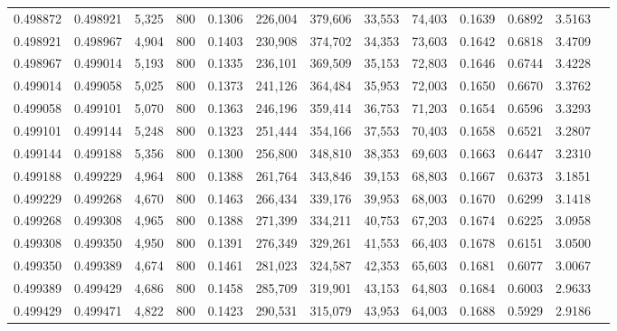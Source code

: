 \begin{tabular}{rrrrrrrrrrrrr}
0.498872 & 0.498921 & 5,325 & 800 &                                     0.1306 & 226,004 & 379,606 &  33,553 &  74,403 & 0.1639 & 0.6892 & 3.5163 \\
0.498921 & 0.498967 & 4,904 & 800 &                                     0.1403 & 230,908 & 374,702 &  34,353 &  73,603 & 0.1642 & 0.6818 & 3.4709 \\
0.498967 & 0.499014 & 5,193 & 800 &                                     0.1335 & 236,101 & 369,509 &  35,153 &  72,803 & 0.1646 & 0.6744 & 3.4228 \\
0.499014 & 0.499058 & 5,025 & 800 &                                     0.1373 & 241,126 & 364,484 &  35,953 &  72,003 & 0.1650 & 0.6670 & 3.3762 \\
0.499058 & 0.499101 & 5,070 & 800 &                                     0.1363 & 246,196 & 359,414 &  36,753 &  71,203 & 0.1654 & 0.6596 & 3.3293 \\
0.499101 & 0.499144 & 5,248 & 800 &                                     0.1323 & 251,444 & 354,166 &  37,553 &  70,403 & 0.1658 & 0.6521 & 3.2807 \\
0.499144 & 0.499188 & 5,356 & 800 &                                     0.1300 & 256,800 & 348,810 &  38,353 &  69,603 & 0.1663 & 0.6447 & 3.2310 \\
0.499188 & 0.499229 & 4,964 & 800 &                                     0.1388 & 261,764 & 343,846 &  39,153 &  68,803 & 0.1667 & 0.6373 & 3.1851 \\
0.499229 & 0.499268 & 4,670 & 800 &                                     0.1463 & 266,434 & 339,176 &  39,953 &  68,003 & 0.1670 & 0.6299 & 3.1418 \\
0.499268 & 0.499308 & 4,965 & 800 &                                     0.1388 & 271,399 & 334,211 &  40,753 &  67,203 & 0.1674 & 0.6225 & 3.0958 \\
0.499308 & 0.499350 & 4,950 & 800 &                                     0.1391 & 276,349 & 329,261 &  41,553 &  66,403 & 0.1678 & 0.6151 & 3.0500 \\
0.499350 & 0.499389 & 4,674 & 800 &                                     0.1461 & 281,023 & 324,587 &  42,353 &  65,603 & 0.1681 & 0.6077 & 3.0067 \\
0.499389 & 0.499429 & 4,686 & 800 &                                     0.1458 & 285,709 & 319,901 &  43,153 &  64,803 & 0.1684 & 0.6003 & 2.9633 \\
0.499429 & 0.499471 & 4,822 & 800 &                                     0.1423 & 290,531 & 315,079 &  43,953 &  64,003 & 0.1688 & 0.5929 & 2.9186 \\

\end{tabular}
